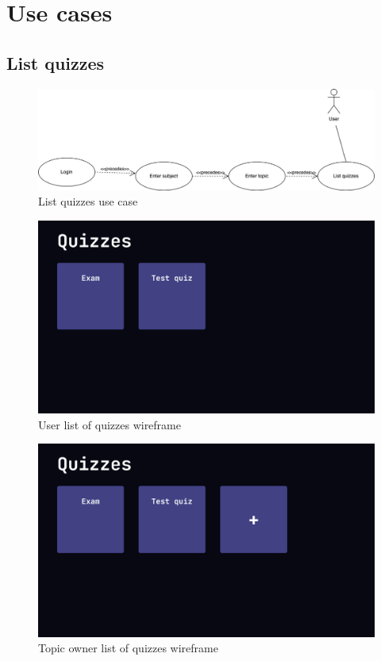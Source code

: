 \documentclass[
    english, %
]{VUMIFPSkursinis}
\begin{document}
\section{Use cases}

\subsection{List quizzes}

\begin{figure}[ht]
    \centering
    \includegraphics[width=\textwidth]{../lab3diags/list.drawio Large.jpeg}
    \caption{List quizzes use case}
    \label{list-quizzes}
\end{figure}

\begin{figure}[ht]
    \centering
    \includegraphics[width=\textwidth]{../lab3diags/Quiz list (User).png}
    \caption{User list of quizzes wireframe}
    \label{wireframe-quiz-list-user}
\end{figure}

\begin{figure}[ht]
    \centering
    \includegraphics[width=\textwidth]{../lab3diags/Quiz list.png}
    \caption{Topic owner list of quizzes wireframe}
    \label{wireframe-quiz-list-topic-owner}
\end{figure}
\end{document}
